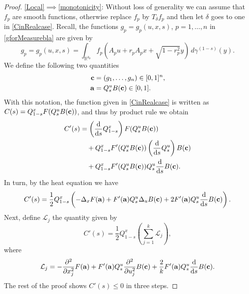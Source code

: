 \documentclass[9pt, a4paper]{amsart}
\newcommand{\R}{\mathbb{R}}
\newcommand{\1}{{\chi_{}}}%
\numberwithin{equation}{section}
\begin{document}
\begin{proof}
		\vspace{0.2cm}
\eqref{Local}$\implies$\eqref{monotonicity}: %
Without loss of generality we can assume that $f_p$ are smooth functions, otherwise replace $f_p$ by $T_{\delta}f_p$ and then let $\delta$ goes to one in \eqref{CinRealcase}. Recall, the functions $g_p=g_{p}(u,x,s)$, $p=1,\ldots,n$ in \eqref{gforMeasurebla} are given by
\begin{equation}\label{recallg_p}
g_p=g_p(u,x,s)=\int_{\mathbb{R}^{k_p}} f_p(A_p u + r_p A_p x + \sqrt{1 - r_p^2} y) \, d\gamma^{(1-s)}(y).
\end{equation}
We define the following two quantities 
\begin{align*}
	{\bf{c}}&=(g_1,\ldots,g_n)\in[0,1]^n,\\
	{\bf{a}}&=Q_{s}^{u}B({\bf{c}})\in[0,1].
\end{align*}
With this notation, the function given in \eqref{CinRealcase} is written as $C(s)=Q_{1-s}^xF(Q_{s}^{u}B({\bf{c}}))$, and thus by product rule we obtain
\begin{align*}
	C'(s)&=\left(\frac{\mathrm{d}}{\mathrm{d} s}Q_{1-s}^x\right)F(Q_{s}^{u}B({\bf{c}}))\\
	&\quad+Q_{1-s}^xF'(Q_{s}^{u}B({\bf{c}}))\left(\frac{\mathrm{d}}{\mathrm{d} s}Q_s^u\right)B({\bf{c}}) \\
	&\quad+Q_{1-s}^xF'(Q_{s}^{u}B({\bf{c}})) Q_s^u\frac{\mathrm{d}}{\mathrm{d} s} B({\bf{c}}).
\end{align*}
In turn, by the heat equation we have
\begin{equation*}
	C'(s)=\frac{1}{2}Q_{1-s}^x\left(-\Delta_xF({\bf{a}})+F'({\bf{a}})Q_s^u\Delta_uB({\bf{c}}) +2F'({\bf{a}}) Q_s^u\frac{\mathrm{d}}{\mathrm{d} s} B({\bf{c}})\right).
\end{equation*}
Next, define $\mathcal{L}_j$ the quantity given by
\begin{equation}\label{derC}
	C'(s)=\frac{1}{2}Q_{1-s}^x\left(\sum_{j=1}^k\mathcal{L}_j\right),
\end{equation}
where
\begin{align}\label{L_j}
	\mathcal{L}_j=-	\frac{\partial^2}{\partial x_j^2}F({\bf{a}})+  F'({\bf{a}}) Q_s^u \frac{\partial^2}{\partial u_j^2}B({\bf{c}})+\frac{2}{k}F'({\bf{a}})Q_s^u\frac{\mathrm{d}}{\mathrm{d}s}B({\bf{c}}).
\end{align}
The rest of the proof shows $C'(s)\leq 0$ in three steps.
\vspace{0.2cm}


\end{proof}
\end{document}
